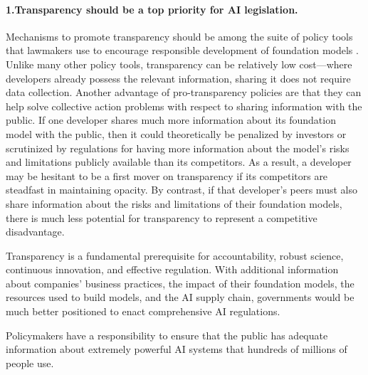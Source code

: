 \paragraph{1.\phantom{X}Transparency should be a top priority for AI legislation.} 
    \begin{myitemize}
        \item Mechanisms to promote transparency should be among the suite of policy tools that lawmakers use to encourage responsible development of foundation models \citep{engler2023casc, hacker2023gpt}.
        Unlike many other policy tools, transparency can be relatively low cost---where developers already possess the relevant information, sharing it does not require data collection. 
        Another advantage of pro-transparency policies are that they can help solve collective action problems with respect to sharing information with the public. 
        If one developer shares much more information about its foundation model with the public, then it could theoretically be penalized by investors or scrutinized by regulations for having more information about the model's risks and limitations publicly available than its competitors. 
        As a result, a developer may be hesitant to be a first mover on transparency if its competitors are steadfast in maintaining opacity. 
        By contrast, if that developer's peers must also share information about the risks and limitations of their foundation models, there is much less potential for transparency to represent a competitive disadvantage. 
        \item Transparency is a fundamental prerequisite for accountability, robust science, continuous innovation, and effective regulation. 
        With additional information about companies' business practices, the impact of their foundation models, the resources used to build models, and the AI supply chain, governments would be much better positioned to enact comprehensive AI regulations. 
        \item Policymakers have a responsibility to ensure that the public has adequate information about extremely powerful AI systems that hundreds of millions of people use. 
    \end{myitemize}
